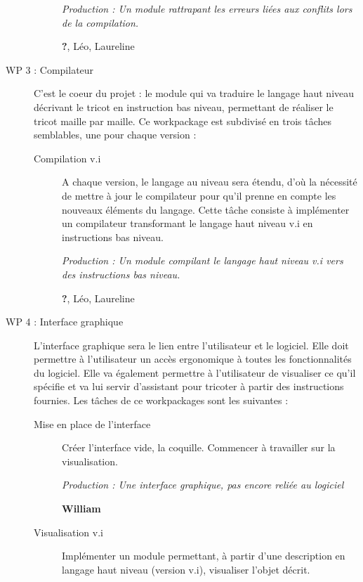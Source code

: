 \documentclass{article}
\begin{document}
\begin{description}
\begin{description}
      \textit{Production : Un module rattrapant les erreurs liées aux conflits lors de la compilation.}

      \textbf{?}, Léo, Laureline

    \end{description}

\medskip

\item[WP 3 : Compilateur] C'est le coeur du projet : le module qui va traduire le langage haut niveau décrivant le tricot en instruction bas niveau, permettant de réaliser le tricot maille par maille. Ce workpackage est subdivisé en trois tâches semblables, une pour chaque version :

    \begin{description}
    \item[Compilation v.i] A chaque version, le langage au niveau sera étendu, d'où la nécessité de mettre à jour le compilateur pour qu'il prenne en compte les nouveaux éléments du langage. Cette tâche consiste à implémenter un compilateur transformant le langage haut niveau v.i en instructions bas niveau.

      \textit{Production : Un module compilant le langage haut niveau v.i vers des instructions bas niveau.}

      \textbf{?}, Léo, Laureline %
    \end{description}

\medskip

\item[WP 4 : Interface graphique] L'interface graphique sera le lien entre l'utilisateur et le logiciel. Elle doit permettre à l'utilisateur un accès ergonomique à toutes les fonctionnalités du logiciel. Elle va également permettre à l'utilisateur de visualiser ce qu'il spécifie et va lui servir d'assistant pour tricoter à partir des instructions fournies. Les tâches de ce workpackages sont les suivantes :

  \begin{description}
  \item[Mise en place de l'interface] Créer l'interface vide, la coquille. Commencer à travailler sur la visualisation.

    \textit{Production : Une interface graphique, pas encore reliée au logiciel}

    \textbf{William}

  \item[Visualisation v.i] Implémenter un module permettant, à partir d'une description en langage haut niveau (version v.i), visualiser l'objet décrit.


\end{description}
\end{description}
\end{document}
